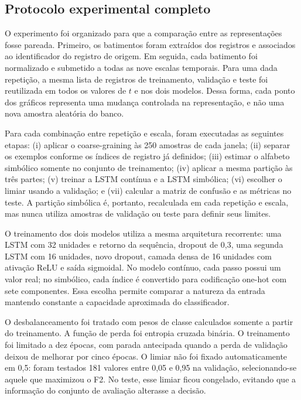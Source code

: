 \documentclass[12pt,a4paper]{article}
\begin{document}
\subsection{Protocolo experimental completo}

O experimento foi organizado para que a comparação entre as representações fosse pareada. Primeiro, os batimentos foram extraídos dos registros e associados ao identificador do registro de origem. Em seguida, cada batimento foi normalizado e submetido a todas as nove escalas temporais. Para uma dada repetição, a mesma lista de registros de treinamento, validação e teste foi reutilizada em todos os valores de $t$ e nos dois modelos. Dessa forma, cada ponto dos gráficos representa uma mudança controlada na representação, e não uma nova amostra aleatória do banco.

Para cada combinação entre repetição e escala, foram executadas as seguintes etapas: (i) aplicar o coarse-graining às 250 amostras de cada janela; (ii) separar os exemplos conforme os índices de registro já definidos; (iii) estimar o alfabeto simbólico somente no conjunto de treinamento; (iv) aplicar a mesma partição às três partes; (v) treinar a LSTM contínua e a LSTM simbólica; (vi) escolher o limiar usando a validação; e (vii) calcular a matriz de confusão e as métricas no teste. A partição simbólica é, portanto, recalculada em cada repetição e escala, mas nunca utiliza amostras de validação ou teste para definir seus limites.

O treinamento dos dois modelos utiliza a mesma arquitetura recorrente: uma LSTM com 32 unidades e retorno da sequência, dropout de 0,3, uma segunda LSTM com 16 unidades, novo dropout, camada densa de 16 unidades com ativação ReLU e saída sigmoidal. No modelo contínuo, cada passo possui um valor real; no simbólico, cada índice é convertido para codificação one-hot com sete componentes. Essa escolha permite comparar a natureza da entrada mantendo constante a capacidade aproximada do classificador.

O desbalanceamento foi tratado com pesos de classe calculados somente a partir do treinamento. A função de perda foi entropia cruzada binária. O treinamento foi limitado a dez épocas, com parada antecipada quando a perda de validação deixou de melhorar por cinco épocas. O limiar não foi fixado automaticamente em 0,5: foram testados 181 valores entre 0,05 e 0,95 na validação, selecionando-se aquele que maximizou o F2. No teste, esse limiar ficou congelado, evitando que a informação do conjunto de avaliação alterasse a decisão.
\end{document}
